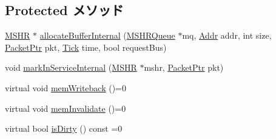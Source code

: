 \subsection*{Protected メソッド}
\begin{DoxyCompactItemize}
\item 
\hyperlink{classMSHR}{MSHR} $\ast$ \hyperlink{classBaseCache_a2183a3718ac71defa0314e7030c4bfe5}{allocateBufferInternal} (\hyperlink{classMSHRQueue}{MSHRQueue} $\ast$mq, \hyperlink{base_2types_8hh_af1bb03d6a4ee096394a6749f0a169232}{Addr} addr, int size, \hyperlink{classPacket}{PacketPtr} pkt, \hyperlink{base_2types_8hh_a5c8ed81b7d238c9083e1037ba6d61643}{Tick} time, bool requestBus)
\item 
void \hyperlink{classBaseCache_a08042a551e2a1bcdd036c84d277bc89f}{markInServiceInternal} (\hyperlink{classMSHR}{MSHR} $\ast$mshr, \hyperlink{classPacket}{PacketPtr} pkt)
\item 
virtual void \hyperlink{classBaseCache_afd3c83f1883488031612de6c47fcaabb}{memWriteback} ()=0
\item 
virtual void \hyperlink{classBaseCache_aeb9356f940fbf8410f41920ee1d5864d}{memInvalidate} ()=0
\item 
virtual bool \hyperlink{classBaseCache_a373dc1334f26db2ba94e827f3c9adc83}{isDirty} () const =0
\end{DoxyCompactItemize}
